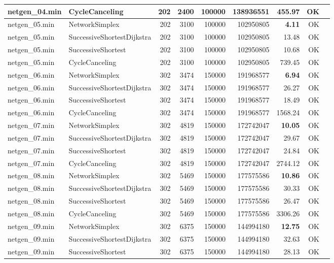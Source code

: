 \begin{longtable}{llrrrrrrl}
netgen\_04.min & CycleCanceling & 202 & 2400 & 100000 & 138936551 & 455.97 & OK \\
\midrule
netgen\_05.min & NetworkSimplex & 202 & 3100 & 100000 & 102950805 & \textbf{4.11} & OK \\
netgen\_05.min & SuccessiveShortestDijkstra & 202 & 3100 & 100000 & 102950805 & 13.48 & OK \\
netgen\_05.min & SuccessiveShortest & 202 & 3100 & 100000 & 102950805 & 10.68 & OK \\
netgen\_05.min & CycleCanceling & 202 & 3100 & 100000 & 102950805 & 739.45 & OK \\
\midrule
netgen\_06.min & NetworkSimplex & 302 & 3474 & 150000 & 191968577 & \textbf{6.94} & OK \\
netgen\_06.min & SuccessiveShortestDijkstra & 302 & 3474 & 150000 & 191968577 & 26.27 & OK \\
netgen\_06.min & SuccessiveShortest & 302 & 3474 & 150000 & 191968577 & 18.49 & OK \\
netgen\_06.min & CycleCanceling & 302 & 3474 & 150000 & 191968577 & 1568.24 & OK \\
\midrule
netgen\_07.min & NetworkSimplex & 302 & 4819 & 150000 & 172742047 & \textbf{10.05} & OK \\
netgen\_07.min & SuccessiveShortestDijkstra & 302 & 4819 & 150000 & 172742047 & 29.67 & OK \\
netgen\_07.min & SuccessiveShortest & 302 & 4819 & 150000 & 172742047 & 24.84 & OK \\
netgen\_07.min & CycleCanceling & 302 & 4819 & 150000 & 172742047 & 2744.12 & OK \\
\midrule
netgen\_08.min & NetworkSimplex & 302 & 5469 & 150000 & 177575586 & \textbf{10.86} & OK \\
netgen\_08.min & SuccessiveShortestDijkstra & 302 & 5469 & 150000 & 177575586 & 30.33 & OK \\
netgen\_08.min & SuccessiveShortest & 302 & 5469 & 150000 & 177575586 & 26.47 & OK \\
netgen\_08.min & CycleCanceling & 302 & 5469 & 150000 & 177575586 & 3306.26 & OK \\
\midrule
netgen\_09.min & NetworkSimplex & 302 & 6375 & 150000 & 144994180 & \textbf{12.75} & OK \\
netgen\_09.min & SuccessiveShortestDijkstra & 302 & 6375 & 150000 & 144994180 & 32.63 & OK \\
netgen\_09.min & SuccessiveShortest & 302 & 6375 & 150000 & 144994180 & 28.13 & OK \\

\end{longtable}

